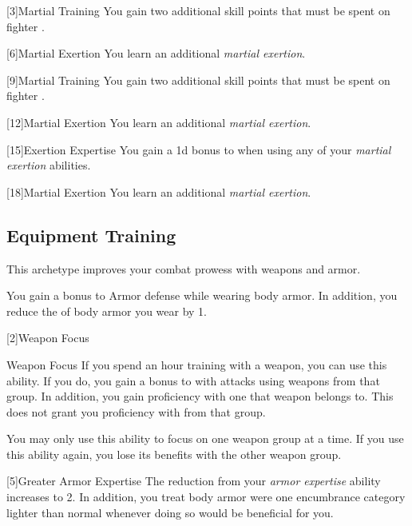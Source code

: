         [3]{Martial Training} You gain two additional skill points that must be spent on fighter .

        [6]{Martial Exertion}
        You learn an additional \textit{martial exertion}.

        [9]{Martial Training} You gain two additional skill points that must be spent on fighter .

        [12]{Martial Exertion} 
        You learn an additional \textit{martial exertion}.

        [15]{Exertion Expertise} You gain a \plus1d bonus to  when using any of your \textit{martial exertion} abilities.

        [18]{Martial Exertion}
        You learn an additional \textit{martial exertion}.

    \subsection{Equipment Training}
        This archetype improves your combat prowess with weapons and armor.

        You gain a  bonus to Armor defense while wearing body armor.
        In addition, you reduce the  of body armor you wear by 1.

        [2]{Weapon Focus}
        \begin{ability}{Weapon Focus}
            If you spend an hour training with a weapon, you can use this ability.
            If you do, you gain a  bonus to  with attacks using weapons from that group.
            In addition, you gain proficiency with one  that weapon belongs to.
            This does not grant you proficiency with  from that group.

            You may only use this ability to focus on one weapon group at a time.
            If you use this ability again, you lose its benefits with the other weapon group.
        \end{ability}

        [5]{Greater Armor Expertise}
        The  reduction from your \textit{armor expertise} ability increases to 2.
        In addition, you treat body armor were one encumbrance category lighter than normal whenever doing so would be beneficial for you.

